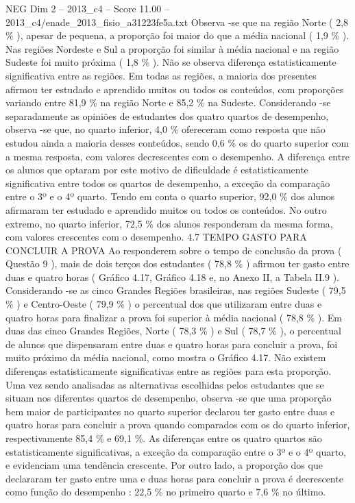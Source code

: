 \begin{textsample}{NEG Dim 2 – 2013\_c4 – Score 11.00 – 2013\_c4/enade\_2013\_fisio\_a31223fe5a.txt}
Observa -se que na região Norte ( 2,8 \% ), apesar de pequena, a proporção foi maior do que a média nacional ( 1,9 \% ).
Nas regiões Nordeste e Sul a proporção foi similar à média nacional e na região Sudeste foi muito próxima ( 1,8 \% ).
Não se observa diferença estatisticamente significativa entre as regiões.
Em todas as regiões, a maioria dos presentes afirmou ter estudado e aprendido muitos ou todos os conteúdos, com proporções variando entre 81,9 \% na região Norte e 85,2 \% na Sudeste.
Considerando -se separadamente as opiniões de estudantes dos quatro quartos de desempenho, observa -se que, no quarto inferior, 4,0 \% ofereceram como resposta que não estudou ainda a maioria desses conteúdos, sendo 0,6 \% os do quarto superior com a mesma resposta, com valores decrescentes com o desempenho.
A diferença entre os alunos que optaram por este motivo de dificuldade é estatisticamente significativa entre todos os quartos de desempenho, a exceção da comparação entre o 3º e o 4º quarto.
Tendo em conta o quarto superior, 92,0 \% dos alunos afirmaram ter estudado e aprendido muitos ou todos os conteúdos.
No outro extremo, no quarto inferior, 72,5 \% dos alunos responderam da mesma forma, com valores crescentes com o desempenho. 4.7 TEMPO GASTO PARA CONCLUIR A PROVA Ao responderem sobre o tempo de conclusão da prova ( Questão 9 ), mais de dois terços dos estudantes ( 78,8 \% ) afirmou ter gasto entre duas e quatro horas ( Gráfico 4.17, Gráfico 4.18 e, no Anexo II, a Tabela II.9 ).
Considerando -se as cinco Grandes Regiões brasileiras, nas regiões Sudeste ( 79,5 \% ) e Centro-Oeste ( 79,9 \% ) o percentual dos que utilizaram entre duas e quatro horas para finalizar a prova foi superior à média nacional ( 78,8 \% ).
Em duas das cinco Grandes Regiões, Norte ( 78,3 \% ) e Sul ( 78,7 \% ), o percentual de alunos que dispensaram entre duas e quatro horas para concluir a prova, foi muito próximo da média nacional, como mostra o Gráfico 4.17.
Não existem diferenças estatisticamente significativas entre as regiões para esta proporção.
Uma vez sendo analisadas as alternativas escolhidas pelos estudantes que se situam nos diferentes quartos de desempenho, observa -se que uma proporção bem maior de participantes no quarto superior declarou ter gasto entre duas e quatro horas para concluir a prova quando comparados com os do quarto inferior, respectivamente 85,4 \% e 69,1 \%.
As diferenças entre os quatro quartos são estatisticamente significativas, a exceção da comparação entre o 3º e o 4º quarto, e evidenciam uma tendência crescente.
Por outro lado, a proporção dos que declararam ter gasto entre uma e duas horas para concluir a prova é decrescente como função do desempenho : 22,5 \% no primeiro quarto e 7,6 \% no último.

\end{textsample}

